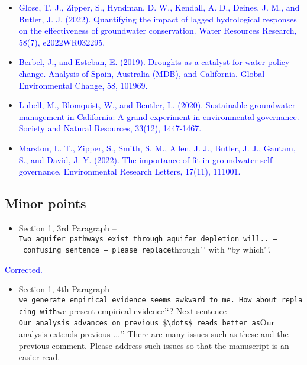 \documentclass[
]{article}
\providecommand{\tightlist}{%
  \setlength{\itemsep}{0pt}\setlength{\parskip}{0pt}}
\begin{document}
\begin{itemize}
\item
  \textcolor{blue}{Glose, T. J., Zipper, S., Hyndman, D. W., Kendall, A. D., Deines, J. M., and Butler, J. J. (2022). Quantifying the impact of lagged hydrological responses on the effectiveness of groundwater conservation. Water Resources Research, 58(7), e2022WR032295.}
\item
  \textcolor{blue}{Berbel, J., and Esteban, E. (2019). Droughts as a catalyst for water policy change. Analysis of Spain, Australia (MDB), and California. Global Environmental Change, 58, 101969.}
\item
  \textcolor{blue}{Lubell, M., Blomquist, W., and Beutler, L. (2020). Sustainable groundwater management in California: A grand experiment in environmental governance. Society and Natural Resources, 33(12), 1447-1467.}
\item
  \textcolor{blue}{Marston, L. T., Zipper, S., Smith, S. M., Allen, J. J., Butler, J. J., Gautam, S., and David, J. Y. (2022). The importance of fit in groundwater self-governance. Environmental Research Letters, 17(11), 111001.}
\end{itemize}

\hypertarget{minor-points}{%
\subsection{Minor points}\label{minor-points}}

\begin{itemize}
\tightlist
\item
  Section 1, 3rd Paragraph --
  \texttt{Two\ aquifer\ pathways\ exist\ through\ aquifer\ depletion\ will..\textquotesingle{}\textquotesingle{}\ –\ confusing\ sentence\ –\ please\ replace}through'\,'
  with ``by which'\,'.
\end{itemize}

\textcolor{blue}{Corrected.}

\begin{itemize}
\tightlist
\item
  Section 1, 4th Paragraph --
  \texttt{we\ generate\ empirical\ evidence\textquotesingle{}\textquotesingle{}\ seems\ awkward\ to\ me.\ How\ about\ replacing\ with}we
  present empirical evidence'`? Next sentence --
  \texttt{Our\ analysis\ advances\ on\ previous\ \$\textbackslash{}dots\$\textquotesingle{}\textquotesingle{}\ reads\ better\ as}Our
  analysis extends previous \(\dots\)'' There are many issues such as
  these and the previous comment. Please address such issues so that the
  manuscript is an easier read.
\end{itemize}
\end{document}
